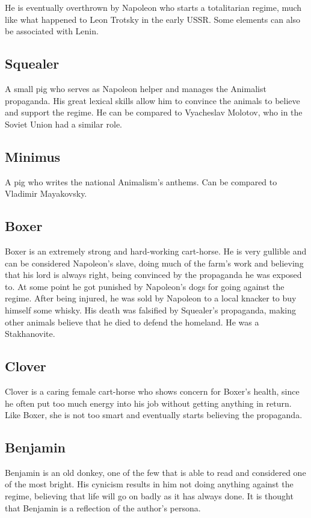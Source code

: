 \documentclass{article}
\begin{document}
    He is eventually overthrown by Napoleon who starts a totalitarian regime, much like what happened to Leon Trotsky in the early USSR. Some elements can also be associated with Lenin.

    \subsection{Squealer}
    A small pig who serves as Napoleon helper and manages the Animalist propaganda. His great lexical skills allow him to convince the animals to believe and support the regime. He can be compared to Vyacheslav Molotov, who in the Soviet Union had a similar role.

    \subsection{Minimus}
    A pig who writes the national Animalism's anthems. Can be compared to Vladimir Mayakovsky.

    \subsection{Boxer}
    Boxer is an extremely strong and hard-working cart-horse. He is very gullible and can be considered Napoleon's slave, doing much of the farm's work and believing that his lord is always right, being convinced by the propaganda he was exposed to. At some point he got punished by Napoleon's dogs for going against the regime. After being injured, he was sold by Napoleon to a local knacker to buy himself some whisky. His death was falsified by Squealer's propaganda, making other animals believe that he died to defend the homeland. He was a Stakhanovite.

    \subsection{Clover}
    Clover is a caring female cart-horse who shows concern for Boxer's health, since he often put too much energy into his job without getting anything in return.
    Like Boxer, she is not too smart and eventually starts believing the propaganda.

    \subsection{Benjamin}
    Benjamin is an old donkey, one of the few that is able to read and considered one of the most bright. His cynicism results in him not doing anything against the regime, believing that life will go on badly as it has always done. It is thought that Benjamin is a reflection of the author's persona.
\end{document}
